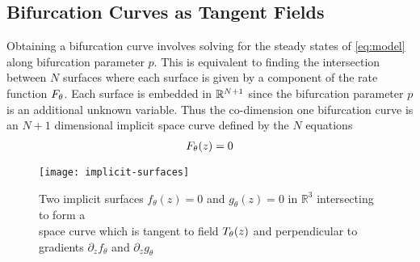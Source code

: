 \subsection{Bifurcation Curves as Tangent Fields}
Obtaining a bifurcation curve involves solving for the steady states of \eqref{eq:model} along bifurcation parameter $p$. This is equivalent to finding the intersection between $N$ surfaces where each surface is given by a component of the rate function $F_{\theta}$. Each surface is embedded in $\mathbb{R}^{N+1}$ since the bifurcation parameter $p$ is an additional unknown variable. Thus the co-dimension one bifurcation curve is an $N+1$ dimensional implicit space curve defined by the $N$ equations
\begin{align}
    F_{\theta}(z) = 0
\end{align}

\begin{figure}[H]
\centering{}
\captionsetup{justification=centering}
\texttt{[image: implicit-surfaces]}
\caption{Two implicit surfaces $f_{\theta}(z)=0$ and $g_{\theta}(z)=0$ in $\mathbb{R}^3$ intersecting to form a\\ space curve which is tangent to field $T_{\theta}(z)$ and perpendicular to gradients $\partial_{z}f_{\theta}$ and $\partial_{z}g_{\theta}$}
\label{fig:implicit-surfaces}
\end{figure}

